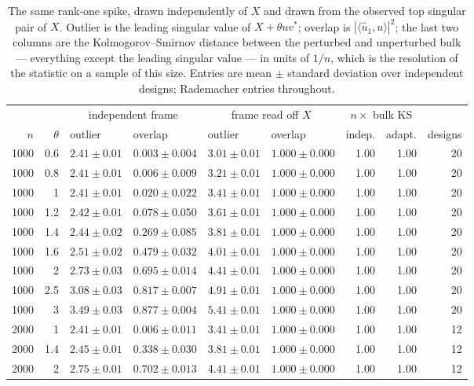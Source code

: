 \documentclass[11pt]{article}
\theoremstyle{definition}
\begin{document}
\begin{table}[htbp]
\centering\small
\caption{The same rank-one spike, drawn independently of $X$ and drawn from the observed top
singular pair of $X$. Outlier is the leading singular value of $X+\theta uv^*$; overlap is
$|\langle\hat u_1,u\rangle|^2$; the last two columns are the Kolmogorov--Smirnov distance between
the perturbed and unperturbed bulk --- everything except the leading singular value --- in units of
$1/n$, which is the resolution of the statistic on a sample of this size. Entries
are mean $\pm$ standard deviation over independent designs; Rademacher entries throughout.}
\label{tab:pruneadapt}
{\setlength{\tabcolsep}{4.5pt}
\begin{tabular}{rrllllrrr}
\toprule
& & \multicolumn{2}{c}{independent frame} & \multicolumn{2}{c}{frame read off $X$} &
\multicolumn{2}{c}{$n\times$ bulk KS} & \\
\cmidrule(lr){3-4}\cmidrule(lr){5-6}\cmidrule(lr){7-8}
$n$ & $\theta$ & outlier & overlap & outlier & overlap & indep. & adapt. & designs\\
\midrule
1000 & 0.6 & $2.41\pm0.01$ & $0.003\pm0.004$ & $3.01\pm0.01$ & $1.000\pm0.000$ & 1.00 & 1.00 & 20\\
1000 & 0.8 & $2.41\pm0.01$ & $0.006\pm0.009$ & $3.21\pm0.01$ & $1.000\pm0.000$ & 1.00 & 1.00 & 20\\
1000 & 1 & $2.41\pm0.01$ & $0.020\pm0.022$ & $3.41\pm0.01$ & $1.000\pm0.000$ & 1.00 & 1.00 & 20\\
1000 & 1.2 & $2.42\pm0.01$ & $0.078\pm0.050$ & $3.61\pm0.01$ & $1.000\pm0.000$ & 1.00 & 1.00 & 20\\
1000 & 1.4 & $2.44\pm0.02$ & $0.269\pm0.085$ & $3.81\pm0.01$ & $1.000\pm0.000$ & 1.00 & 1.00 & 20\\
1000 & 1.6 & $2.51\pm0.02$ & $0.479\pm0.032$ & $4.01\pm0.01$ & $1.000\pm0.000$ & 1.00 & 1.00 & 20\\
1000 & 2 & $2.73\pm0.03$ & $0.695\pm0.014$ & $4.41\pm0.01$ & $1.000\pm0.000$ & 1.00 & 1.00 & 20\\
1000 & 2.5 & $3.08\pm0.03$ & $0.817\pm0.007$ & $4.91\pm0.01$ & $1.000\pm0.000$ & 1.00 & 1.00 & 20\\
1000 & 3 & $3.49\pm0.03$ & $0.877\pm0.004$ & $5.41\pm0.01$ & $1.000\pm0.000$ & 1.00 & 1.00 & 20\\
2000 & 1 & $2.41\pm0.01$ & $0.006\pm0.011$ & $3.41\pm0.01$ & $1.000\pm0.000$ & 1.00 & 1.00 & 12\\
2000 & 1.4 & $2.45\pm0.01$ & $0.338\pm0.030$ & $3.81\pm0.01$ & $1.000\pm0.000$ & 1.00 & 1.00 & 12\\
2000 & 2 & $2.75\pm0.01$ & $0.702\pm0.013$ & $4.41\pm0.01$ & $1.000\pm0.000$ & 1.00 & 1.00 & 12\\
\bottomrule
\end{tabular}}
\end{table}
\end{document}
